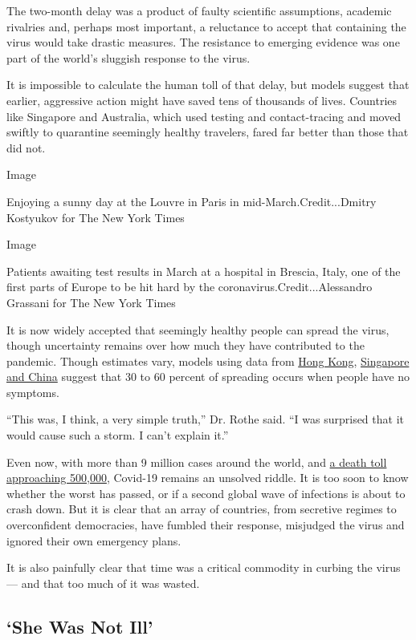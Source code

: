 The two-month delay was a product of faulty scientific assumptions,
academic rivalries and, perhaps most important, a reluctance to accept
that containing the virus would take drastic measures. The resistance to
emerging evidence was one part of the world's sluggish response to the
virus.

It is impossible to calculate the human toll of that delay, but models
suggest that earlier, aggressive action might have saved tens of
thousands of lives. Countries like Singapore and Australia, which used
testing and contact-tracing and moved swiftly to quarantine seemingly
healthy travelers, fared far better than those that did not.

Image

Enjoying a sunny day at the Louvre in Paris in mid-March.Credit...Dmitry
Kostyukov for The New York Times

Image

Patients awaiting test results in March at a hospital in Brescia, Italy,
one of the first parts of Europe to be hit hard by the
coronavirus.Credit...Alessandro Grassani for The New York Times

It is now widely accepted that seemingly healthy people can spread the
virus, though uncertainty remains over how much they have contributed to
the pandemic. Though estimates vary, models using data from
\href{https://www.nature.com/articles/s41591-020-0869-5}{Hong Kong},
\href{https://www.eurosurveillance.org/content/10.2807/1560-7917.ES.2020.25.17.2000257}{Singapore
and China} suggest that 30 to 60 percent of spreading occurs when people
have no symptoms.

``This was, I think, a very simple truth,'' Dr. Rothe said. ``I was
surprised that it would cause such a storm. I can't explain it.''

Even now, with more than 9 million cases around the world, and
\href{https://www.nytimes3xbfgragh.onion/interactive/2020/world/coronavirus-maps.html}{a
death toll approaching 500,000}, Covid-19 remains an unsolved riddle. It
is too soon to know whether the worst has passed, or if a second global
wave of infections is about to crash down. But it is clear that an array
of countries, from secretive regimes to overconfident democracies, have
fumbled their response, misjudged the virus and ignored their own
emergency plans.

It is also painfully clear that time was a critical commodity in curbing
the virus --- and that too much of it was wasted.

\hypertarget{she-was-not-ill}{%
\subsection{`She Was Not Ill'}\label{she-was-not-ill}}

